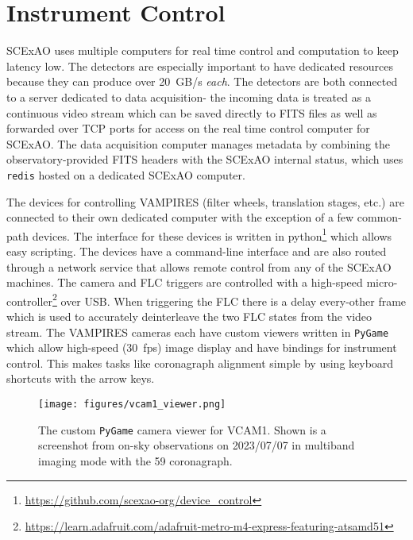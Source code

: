 \section{Instrument Control}\label{sec:control}

SCExAO uses multiple computers for real time control and computation to keep latency low. The detectors are especially important to have dedicated resources because they can produce over \SI{20}{GB/s} \textit{each}. The detectors are both connected to a server dedicated to data acquisition- the incoming data is treated as a continuous video stream which can be saved directly to FITS files as well as forwarded over TCP ports for access on the real time control computer for SCExAO. The data acquisition computer manages metadata by combining the observatory-provided FITS headers with the SCExAO internal status, which uses \texttt{redis} hosted on a dedicated SCExAO computer.

The devices for controlling VAMPIRES (filter wheels, translation stages, etc.) are connected to their own dedicated computer with the exception of a few common-path devices. The interface for these devices is written in python\footnote{\url{https://github.com/scexao-org/device_control}} which allows easy scripting. The devices have a command-line interface and are also routed through a network service that allows remote control from any of the SCExAO machines. The camera and FLC triggers are controlled with a high-speed micro-controller\footnote{\url{https://learn.adafruit.com/adafruit-metro-m4-express-featuring-atsamd51}} over USB. When triggering the FLC there is a delay every-other frame which is used to accurately deinterleave the two FLC states from the video stream. The VAMPIRES cameras each have custom viewers written in \texttt{PyGame} which allow high-speed (\SI{30}{fps}) image display and have bindings for instrument control. This makes tasks like coronagraph alignment simple by using keyboard shortcuts with the arrow keys.

\begin{figure}
    \centering
    \texttt{[image: figures/vcam1\_viewer.png]}
    \caption{The custom \texttt{PyGame} camera viewer for VCAM1. Shown is a screenshot from on-sky observations on 2023/07/07 in multiband imaging mode with the \SI{59}{\mas} coronagraph.}
    \label{fig:vcam1}
\end{figure}
